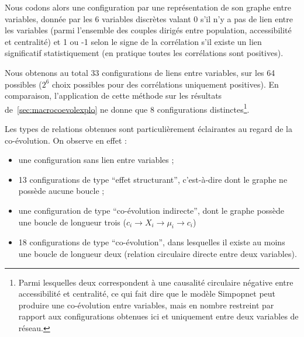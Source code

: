 Nous codons alors une configuration par une représentation de son graphe entre variables, donnée par les 6 variables discrètes valant 0 s'il n'y a pas de lien entre les variables (parmi l'ensemble des couples dirigés entre population, accessibilité et centralité) et 1 ou -1 selon le signe de la corrélation s'il existe un lien significatif statistiquement (en pratique toutes les corrélations sont positives).

Nous obtenons au total 33 configurations de liens entre variables, sur les 64 possibles ($2^6$ choix possibles pour des corrélations uniquement positives). En comparaison, l'application de cette méthode sur les résultats de~\ref{sec:macrocoevolexplo} ne donne que 8 configurations distinctes\footnote{Parmi lesquelles deux correspondent à une causalité circulaire négative entre accessibilité et centralité, ce qui fait dire que le modèle Simpopnet peut produire une co-évolution entre variables, mais en nombre restreint par rapport aux configurations obtenues ici et uniquement entre deux variables de réseau.}.

Les types de relations obtenues sont particulièrement éclairantes au regard de la co-évolution. On observe en effet :
\begin{itemize}
	\item une configuration sans lien entre variables ;
	\item 13 configurations de type ``effet structurant'', c'est-à-dire dont le graphe ne possède aucune boucle ; 
	\item une configuration de type ``co-évolution indirecte'', dont le graphe possède une boucle de longueur trois ($c_i \rightarrow X_i \rightarrow \mu_i \rightarrow c_i$)
	\item 18 configurations de type ``co-évolution'', dans lesquelles il existe au moins une boucle de longueur deux (relation circulaire directe entre deux variables).
\end{itemize}



